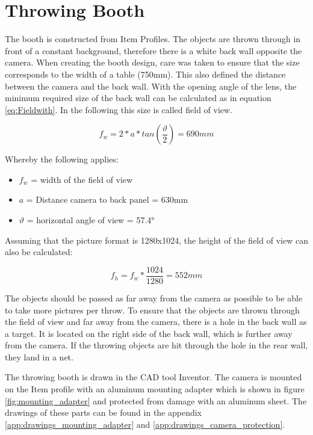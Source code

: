 \section{Throwing Booth}
\label{sec:booth}
The booth is constructed from Item Profiles.
The objects are thrown through in front of a constant background, therefore there is a white back wall opposite the camera.
When creating the booth design, care was taken to ensure that the size corresponds to the width of a table (750mm).
This also defined the distance between the camera and the back wall.
With the opening angle of the lens, the minimum required size of the back wall can be calculated as in equation \ref{eq:Fieldwith}. 
In the following this size is called field of view.

\begin{equation}
	f_w = 2*a*tan\left( \frac{\vartheta}{2}\right) = 690mm
	\label{eq:Fieldwith}
\end{equation}

Whereby the following applies:
\begin{itemize}
	\item $f_w$ = width of the field of view
	\item $a$ = Distance camera to back panel = 630mm
	\item $\vartheta$ = horizontal angle of view = 57.4° \cite{BaumerLense}
\end{itemize}

Assuming that the picture format is 1280x1024, the height of the field of view can also be calculated:

\begin{equation}
	f_h = f_w*\frac{1024}{1280} = 552mm
	\label{eq:Fieldhight}
\end{equation}

The objects should be passed as far away from the camera as possible to be able to take more pictures per throw.
To ensure that the objects are thrown through the field of view and far away from the camera, there is a hole in the back wall as a target.
It is located on the right side of the back wall, which is further away from the camera.
If the throwing objects are hit through the hole in the rear wall, they land in a net.

The throwing booth is drawn in the CAD tool Inventor.
The camera is mounted on the Item profile with an aluminum mounting adapter which is shown in figure \ref{fig:mounting_adapter} and protected from damage with an aluminum sheet.
The drawings of these parts can be found in the appendix \ref{app:drawings_mounting_adapter} and \ref{app:drawings_camera_protection}.

